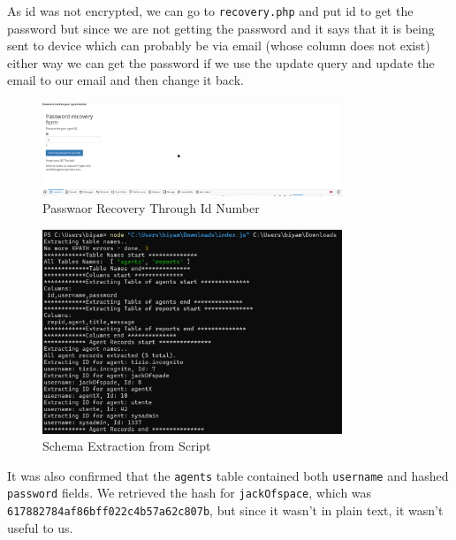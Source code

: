 \documentclass[12pt]{article}
\begin{document}
\FloatBarrier

As id was not encrypted, we can go to \texttt{recovery.php} and put id to get the password but since we are not getting the password and it says that it is being sent to device which can probably be via email (whose column does not exist) either way we can get the password if we use the update query and update the email to our email and then change it back.

\begin{figure}[h!]
\centering
\includegraphics[width=0.8\textwidth]{Recovery.png}
\caption{Passwaor Recovery Through Id Number }
\label{fig:sql_injection}
\end{figure}

\FloatBarrier 

\begin{figure}[h!]
\centering
\includegraphics[width=0.8\textwidth]{script.png}
\caption{Schema Extraction from Script}
\label{fig:sql_injection}
\end{figure}

\FloatBarrier

It was also confirmed that the \texttt{agents} table contained both \texttt{username} and hashed \texttt{password} fields. We retrieved the hash for \texttt{jackOfspace}, which was \texttt{617882784af86bff022c4b57a62c807b}, but since it wasn't in plain text, it wasn't useful to us.
\end{document}
